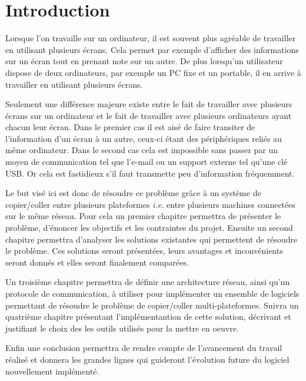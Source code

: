 \chapter*{Introduction}
\renewcommand{\leftmark}{INTRODUCTION}

Lorsque l'on travaille sur un ordinateur, il est souvent plus agréable
de travailler en utilisant plusieurs écrans. Cela permet par exemple
d'afficher des informations sur un écran tout en prenant note sur un autre.
De plus lorsqu'un utilisateur dispose de deux ordinateurs, par exemple
un PC fixe et un portable, il en arrive à travailler en utilisant plusieurs
écrans.

Seulement une différence majeure existe entre le fait de travailler
avec plusieurs écrans sur un ordinateur et le fait de travailler avec
plusieurs ordinateurs ayant chacun leur écran. Dans le premier cas il est
aisé de faire transiter de l'information d'un écran à un autre, ceux-ci
étant des périphériques reliés au même ordinateur. Dans le second cas
cela est impossible sans passer par un moyen de communication tel que l'e-mail
ou un support externe tel qu'une clé USB. Or cela est fastidieux
s'il faut transmette peu d'information fréquemment.

Le but visé ici est donc de résoudre ce problème grâce
à un système de copier/coller entre plusieurs plateformes \emph{i.e.} entre
plusieurs machines connectées sur le même réseau.
Pour cela un premier chapitre permettra de présenter le problème, d'énoncer
les objectifs et les contraintes du projet. Ensuite un second chapitre
permettra d'analyser les solutions existantes qui permettent de résoudre
le problème. Ces solutions seront présentées, leurs avantages et inconvénients
seront donnés et elles seront finalement comparées.

Un troisième chapitre
permettra de définir une architecture réseau, ainsi qu'un protocole de
communication, à utiliser pour implémenter un ensemble de logiciels
permettant de résoudre le problème de copier/coller multi-plateformes.
Suivra un quatrième chapitre présentant l'implémentantion de cette solution,
décrivant et justifiant le choix des les outils utilisés pour la mettre en
oeuvre.

Enfin une conclusion permettra de rendre compte de l'avancement du travail
réalisé et donnera les grandes lignes qui guideront l'évolution future
du logiciel nouvellement implémenté.